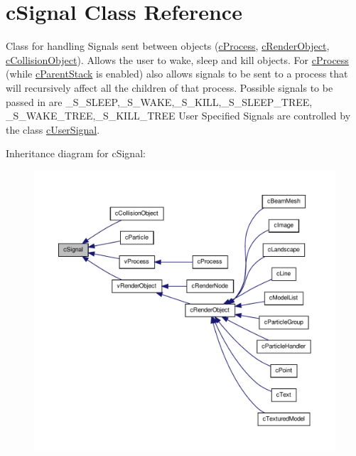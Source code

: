\hypertarget{classc_signal}{
\section{cSignal Class Reference}
\label{classc_signal}
}


Class for handling Signals sent between objects (\hyperlink{classc_process}{cProcess}, \hyperlink{classc_render_object}{cRenderObject}, \hyperlink{classc_collision_object}{cCollisionObject}). Allows the user to wake, sleep and kill objects. For \hyperlink{classc_process}{cProcess} (while \hyperlink{classc_parent_stack}{cParentStack} is enabled) also allows signals to be sent to a process that will recursively affect all the children of that process. Possible signals to be passed in are \_\-S\_\-SLEEP,\_\-S\_\-WAKE,\_\-S\_\-KILL,\_\-S\_\-SLEEP\_\-TREE, \_\-S\_\-WAKE\_\-TREE,\_\-S\_\-KILL\_\-TREE User Specified Signals are controlled by the class \hyperlink{classc_user_signal}{cUserSignal}.  




Inheritance diagram for cSignal:
\nopagebreak
\begin{figure}[H]
\begin{center}
\leavevmode
\includegraphics[width=400pt]{classc_signal__inherit__graph}
\end{center}
\end{figure}
